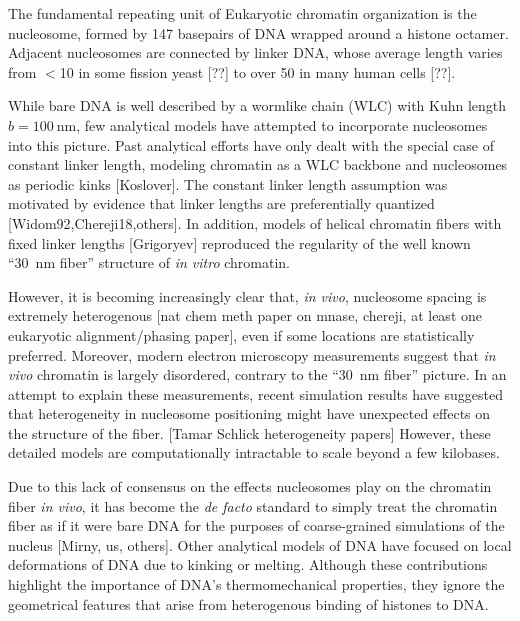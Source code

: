 \documentclass[%
 reprint,
superscriptaddress,
showpacs,preprintnumbers,
 amsmath,amssymb,
 aps,
 prl,
]{revtex4-1}
\begin{document}
The fundamental repeating unit of Eukaryotic chromatin organization is the
    nucleosome, formed by 147 basepairs of DNA wrapped around a histone octamer.
Adjacent nucleosomes are connected by linker DNA, whose average length varies from
    $<$\SI{10}{\basepair} in some fission yeast [??] to over \SI{50}{\basepair} in
    many human cells [??].

While bare DNA is well described by a wormlike chain (WLC) with Kuhn length
    {$b = \SI{100}{\nano\metre}$}, few analytical models have attempted to
    incorporate nucleosomes into this picture.
Past analytical efforts have only dealt with the special
    case of constant linker length, modeling chromatin as a WLC backbone and
    nucleosomes as periodic kinks [Koslover].
The constant linker length assumption was motivated by evidence
    that linker lengths are preferentially quantized [Widom92,Chereji18,others].
In addition, models of helical chromatin fibers with fixed linker lengths [Grigoryev] reproduced the regularity of the
    well known ``\SI{30}{\nano\metre} fiber'' structure of \textit{in vitro}
    chromatin.

However, it is becoming increasingly clear that, \textit{in vivo}, nucleosome
    spacing is extremely heterogenous [nat chem meth paper on mnase, chereji, at
    least one eukaryotic alignment/phasing paper], even if some locations are
    statistically preferred.
Moreover, modern electron microscopy measurements suggest that \textit{in vivo} chromatin
    is largely disordered, contrary to the ``\SI{30}{\nano\metre} fiber''
    picture.
In an attempt to explain these measurements, recent simulation results have suggested that heterogeneity in
    nucleosome positioning might have unexpected effects on the structure of the
    fiber. [Tamar Schlick heterogeneity papers] However, these detailed models are computationally intractable to scale beyond a few kilobases.

Due to this lack of consensus on the effects nucleosomes play on the
    chromatin fiber \textit{in vivo}, it has become the \textit{de facto}
    standard to simply treat the chromatin fiber as if it were bare DNA for
    the purposes of coarse-grained simulations of the nucleus [Mirny, us,
    others]. Other  analytical models of DNA have focused on local deformations
    of DNA due to kinking or melting. Although these contributions highlight the
    importance of DNA's thermomechanical properties, they ignore the geometrical features that arise from heterogenous binding
    of histones to DNA.
\end{document}

